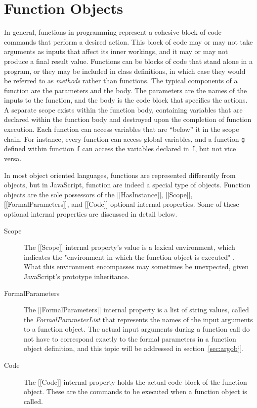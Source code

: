 \documentclass[a4paper,11pt,twoside]{report}
\def\jsinline{\lstinline[language=JavaScript, basicstyle=\small]}%\end{lstlisting}
\begin{document}
\vspace*{-0.7cm}
\section{Function Objects}
In general, functions in programming represent a cohesive block of code commands that perform a desired action. This block of code may or may not take arguments as inputs that affect its inner workings, and it may or may not produce a final result value. Functions can be blocks of code that stand alone in a program, or they may be included in class definitions, in which case they would be referred to as \textit{methods} rather than functions. The typical components of a function are the parameters and the body. The parameters are the names of the inputs to the function, and the body is the code block that specifies the actions. A separate scope exists within the function body, containing variables that are declared within the function body and destroyed upon the completion of function execution. Each function can access variables that are ``below'' it in the scope chain. For instance, every function can access global variables, and a function \jsinline|g| defined within function \jsinline|f| can access the variables declared in \jsinline|f|, but not vice versa.

In most object oriented languages, functions are represented differently from objects, but in JavaScript, function are indeed a special type of objects. Function objects are the sole possessors of the [[HasInstance]], [[Scope]], [[FormalParameters]], and [[Code]] optional internal properties. Some of these optional internal properties are discussed in detail below.

\begin{description}
\item[Scope] The [[Scope]] internal property's value is a lexical environment, which indicates the "environment in which the function object is executed" \cite{EcmaScript}. What this environment encompasses may sometimes be unexpected, given JavaScript's prototype inheritance.

\item[FormalParameters] The [[FormalParameters]] internal property is a list of string values, called the \textit{FormalParameterList} that represents the names of the input arguments to a function object. The actual input arguments during a function call do not have to correspond exactly to the formal parameters in a function object definition, and this topic will be addressed in section~\ref{sec:argobj}.

\item[Code] The [[Code]] internal property holds the actual code block of the function object. These are the commands to be executed when a function object is called.
\end{description}
\end{document}
